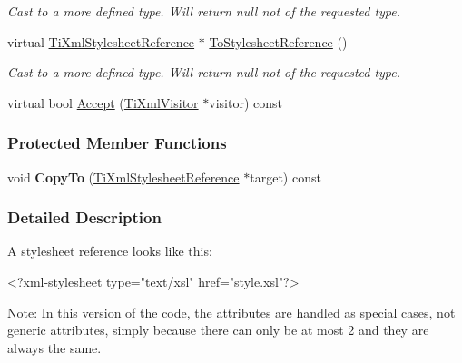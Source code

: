 \begin{DoxyCompactItemize}
\begin{DoxyCompactList}\small\item\em Cast to a more defined type. Will return null not of the requested type. \item\end{DoxyCompactList}\item 
\hypertarget{class_ti_xml_stylesheet_reference_a4fe14deb538559208b1fb95eb57df408}{
virtual \hyperlink{class_ti_xml_stylesheet_reference}{TiXmlStylesheetReference} $\ast$ \hyperlink{class_ti_xml_stylesheet_reference_a4fe14deb538559208b1fb95eb57df408}{ToStylesheetReference} ()}
\label{class_ti_xml_stylesheet_reference_a4fe14deb538559208b1fb95eb57df408}

\begin{DoxyCompactList}\small\item\em Cast to a more defined type. Will return null not of the requested type. \item\end{DoxyCompactList}\item 
virtual bool \hyperlink{class_ti_xml_stylesheet_reference_a540b55b318f90fce1254aa3ecba0331a}{Accept} (\hyperlink{class_ti_xml_visitor}{TiXmlVisitor} $\ast$visitor) const 
\end{DoxyCompactItemize}
\subsubsection*{Protected Member Functions}
\begin{DoxyCompactItemize}
\item 
\hypertarget{class_ti_xml_stylesheet_reference_a2706f8847b2335c47a8d8d7e18b1a466}{
void {\bfseries CopyTo} (\hyperlink{class_ti_xml_stylesheet_reference}{TiXmlStylesheetReference} $\ast$target) const }
\label{class_ti_xml_stylesheet_reference_a2706f8847b2335c47a8d8d7e18b1a466}

\end{DoxyCompactItemize}


\subsubsection{Detailed Description}
A stylesheet reference looks like this: \begin{DoxyVerb}
		<?xml-stylesheet type="text/xsl" href="style.xsl"?>
	\end{DoxyVerb}


Note: In this version of the code, the attributes are handled as special cases, not generic attributes, simply because there can only be at most 2 and they are always the same. 

